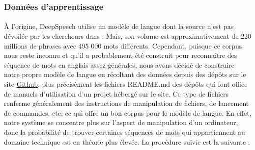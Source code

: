 		\subsubsection*{Données d'apprentissage}
		\paragraph{}
		À l'origine, DeepSpeech utilise un modèle de langue dont la source n'est pas dévoilée par les chercheurs dans \citep{deepspeech_paper}. Mais, son volume est approximativement de 220 millions de phrases avec 495 000 mots différents. Cependant, puisque ce corpus nous reste inconnu et qu'il a probablement été construit pour reconnaître des séquence de mots en anglais assez générales, nous avons décidé de construire notre propre modèle de langue en récoltant des données depuis des dépôts sur le site \href{https://github.com/}{Github}, plus précisément les fichiers README.md des dépôts qui font office de manuels d'utilisation d'un projet hébergé sur le site. Ce type de fichiers renferme généralement des instructions de manipulation de fichiers, de lancement de commandes, etc; ce qui offre un bon corpus pour le modèle de langue. En effet, notre système se concentre plus sur l'aspect de manipulation d'un ordinateur, donc la probabilité de trouver certaines séquences de mots qui appartiennent au domaine technique	 est en théorie plus élevée. La procédure suivie est la suivante : 
		
